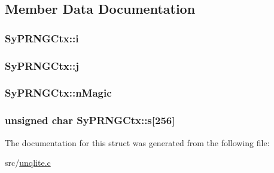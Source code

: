 \subsection{Member Data Documentation}
\hypertarget{struct_sy_p_r_n_g_ctx_a7cb438b2726fecdfd6995d0d050966e1}{
\subsubsection[{i}]{ Sy\-P\-R\-N\-G\-Ctx\-::i}}\label{d4/d7f/struct_sy_p_r_n_g_ctx_a7cb438b2726fecdfd6995d0d050966e1}
\hypertarget{struct_sy_p_r_n_g_ctx_a82ac725ac4be359c01b79b24d2533fa2}{
\subsubsection[{j}]{ Sy\-P\-R\-N\-G\-Ctx\-::j}}\label{d4/d7f/struct_sy_p_r_n_g_ctx_a82ac725ac4be359c01b79b24d2533fa2}
\hypertarget{struct_sy_p_r_n_g_ctx_a93185a416dff8ec45f934f807508e3ee}{
\subsubsection[{n\-Magic}]{ Sy\-P\-R\-N\-G\-Ctx\-::n\-Magic}}\label{d4/d7f/struct_sy_p_r_n_g_ctx_a93185a416dff8ec45f934f807508e3ee}
\hypertarget{struct_sy_p_r_n_g_ctx_a659fafe4c00e41ec6c1f428c9029c51c}{
\subsubsection[{s}]{\setlength{\rightskip}{0pt plus 5cm}unsigned char Sy\-P\-R\-N\-G\-Ctx\-::s\mbox{[}256\mbox{]}}}\label{d4/d7f/struct_sy_p_r_n_g_ctx_a659fafe4c00e41ec6c1f428c9029c51c}


The documentation for this struct was generated from the following file\-:\begin{DoxyCompactItemize}
\item 
src/\hyperlink{unqlite_8c}{unqlite.\-c}\end{DoxyCompactItemize}
